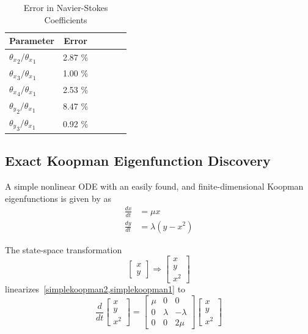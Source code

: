 \documentclass{article}
\begin{document}
\begin{table}[t]
\caption{Error in Navier-Stokes Coefficients}
\label{tab:ns_data}
\vskip 0.15in
\begin{center}
\begin{small}
\begin{sc}
\begin{tabular}{lccccr}
\toprule
Parameter & Error \\
\midrule
${\theta_x}_2 / {\theta_x}_1 $ & 2.87 \% \\
${\theta_x}_3 / {\theta_x}_1 $ & 1.00 \% \\
${\theta_x}_4 / {\theta_x}_1 $ & 2.53 \% \\
${\theta_y}_2 / {\theta_x}_1 $ & 8.47 \% \\
${\theta_y}_3 / {\theta_x}_1 $ & 0.92 \% \\
\bottomrule
\end{tabular}
\end{sc}
\end{small}
\end{center}
\vskip -0.1in
\end{table}

\subsection{Exact Koopman Eigenfunction Discovery}
\label{exactdiscovery}
A simple nonlinear ODE with an easily found, and finite-dimensional Koopman eigenfunctions is given by \citet{kutz2016dynamic} as
\begin{align}
 \label{simplekoopman1}
 \frac{dx}{dt} &= \mu x \\
 \label{simplekoopman2}
 \frac{dy}{dt} &= \lambda(y - x^2)
 \end{align}
 
The state-space transformation
\begin{equation}
    \label{eqn:exacttransform}
\begin{bmatrix}
x\\
y
\end{bmatrix} \Rightarrow \begin{bmatrix}
x \\
y \\
x^2
\end{bmatrix}
\end{equation}
linearizes~\cref{simplekoopman2,simplekoopman1} to
\begin{equation}
    \label{eqn:koopmanop}
\frac{d}{dt} \begin{bmatrix}
x \\
y \\
x^2
\end{bmatrix} = \begin{bmatrix}
\mu & 0 & 0 \\
0 & \lambda & -\lambda \\
0 & 0 & 2 \mu
\end{bmatrix} \begin{bmatrix}
x \\
y \\
x^2
\end{bmatrix}
\end{equation}
\end{document}
